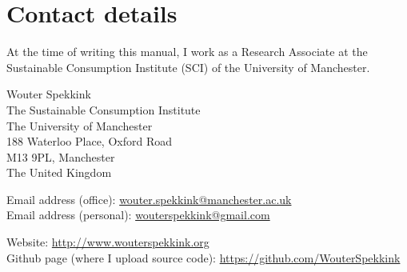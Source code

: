 \documentclass{memoir}
\begin{document}



\chapter{Contact details}
\label{chap:contactdetails}

At the time of writing this manual, I work as a Research Associate at the Sustainable Consumption Institute (SCI) of the University of Manchester.

Wouter Spekkink \\
The Sustainable Consumption Institute \\
The University of Manchester \\
188 Waterloo Place, Oxford Road \\
M13 9PL, Manchester \\
The United Kingdom

Email address (office): \href{mailto:wouter.spekkink@manchester.ac.uk}{wouter.spekkink@manchester.ac.uk} \\
Email address (personal): \href{mailto:wouterspekkink@gmail.com}{wouterspekkink@gmail.com}

Website: \url{http://www.wouterspekkink.org} \\
Github page (where I upload source code): \url{https://github.com/WouterSpekkink}
\end{document}
